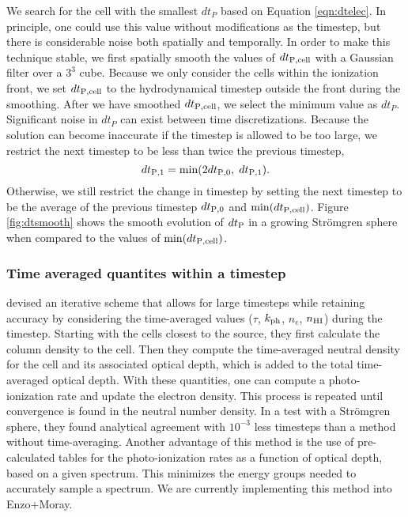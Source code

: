 \documentclass[12pt,preprint]{aastex}
\begin{document}
We search for the cell with the smallest $dt_P$ based on Equation
\ref{eqn:dtelec}.  In principle, one could use this value without
modifications as the timestep, but there is considerable noise both
spatially and temporally.  In order to make this technique stable, we
first spatially smooth the values of $dt_{\rm P,cell}$ with a Gaussian
filter over a $3^3$ cube.  Because we only consider the cells within
the ionization front, we set $dt_{\rm P,cell}$ to the hydrodynamical
timestep outside the front during the smoothing.  After we have
smoothed $dt_{\rm P,cell}$, we select the minimum value as $dt_P$.
Significant noise in $dt_P$ can exist between time discretizations.
Because the solution can become inaccurate if the timestep is allowed
to be too large, we restrict the next timestep to be less than twice
the previous timestep,
%
\begin{equation}
  \label{eqn:dtchange}
  dt_{\rm P,1} = \min(2 dt_{\rm P,0},\; dt_{\rm P,1}).
\end{equation}
Otherwise, we still restrict the change in timestep by setting the
next timestep to be the average of the previous timestep $dt_{\rm
  P,0}$ and $\min(dt_{\rm P,cell})$.  Figure \ref{fig:dtsmooth} shows
the smooth evolution of $dt_{\rm P}$ in a growing Str\"{o}mgren sphere when
compared to the values of $\min(dt_{\rm P,cell})$.

\subsubsection{Time averaged quantites within a timestep}

\citet{Mellema06} devised an iterative scheme that allows for large
timesteps while retaining accuracy by considering the time-averaged
values ($\tau$, $k_{\rm ph}$, $n_e$, $n_{\rm HI}$) during the
timestep.  Starting with the cells closest to the source, they first
calculate the column density to the cell.  Then they compute the
time-averaged neutral density for the cell and its associated optical
depth, which is added to the total time-averaged optical depth.  With
these quantities, one can compute a photo-ionization rate and update
the electron density.  This process is repeated until convergence is
found in the neutral number density.  In a test with a Str\"{o}mgren
sphere, they found analytical agreement with $10^{-3}$ less timesteps
than a method without time-averaging.  Another advantage of this
method is the use of pre-calculated tables for the photo-ionization
rates as a function of optical depth, based on a given spectrum.  This
minimizes the energy groups needed to accurately sample a spectrum.
We are currently implementing this method into Enzo+Moray.
\end{document}
